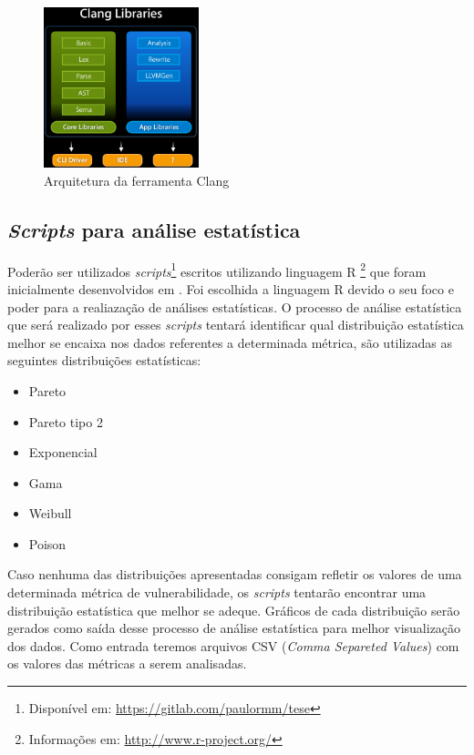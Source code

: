 \begin{figure}[h]
  \centering
  \includegraphics[width=0.4\textwidth]
      {figuras/clang_arch.eps}
  \caption{Arquitetura da ferramenta Clang}
  \label{clang_arch}
\end{figure}

\subsection{\textit{Scripts} para análise estatística} \label{scripts}

Poderão ser utilizados \textit{scripts}\footnote{Disponível em:
\url{https://gitlab.com/paulormm/tese}} escritos utilizando linguagem R
\footnote{Informações em: \url{http://www.r-project.org/}} que foram inicialmente desenvolvidos em \cite{meirelles2013}. Foi escolhida a linguagem R
devido o seu foco e poder para a realiazação de análises estatísticas. O processo de análise estatística que será realizado
por esses \textit{scripts} tentará identificar qual distribuição estatística melhor se encaixa nos dados referentes a 
determinada métrica, são utilizadas as seguintes distribuições estatísticas:

\begin{itemize}
  \item Pareto
  \item Pareto tipo 2
  \item Exponencial
  \item Gama
  \item Weibull
  \item Poison
\end{itemize}

Caso nenhuma das distribuições apresentadas consigam refletir os valores de uma determinada métrica de vulnerabilidade, os
\textit{scripts} tentarão encontrar uma distribuição estatística que melhor se adeque. Gráficos de cada distribuição serão
gerados como saída desse processo de análise estatística para melhor visualização dos dados. Como entrada teremos arquivos
CSV (\textit{Comma Separeted Values}) com os valores das métricas a serem analisadas.

